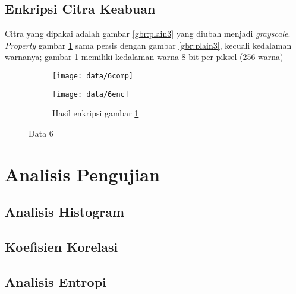 \subsection{Enkripsi Citra Keabuan}
Citra yang dipakai adalah gambar \ref{gbr:plain3} yang diubah menjadi \textit{grayscale}.
 \textit{Property} gambar \ref{gbr:plain6} sama persis dengan gambar \ref{gbr:plain3}, kecuali
 kedalaman warnanya; gambar \ref{gbr:plain6} memiliki kedalaman warna 8-bit per piksel (256 warna)
\begin{figure}\centering
	\begin{subfigure}{\textwidth}
		\texttt{[image: data/6comp]}
		\caption{}
		\label{gbr:plain6}
	\end{subfigure}
	\begin{subfigure}{\textwidth}
		\texttt{[image: data/6enc]}
		\caption{Hasil enkripsi gambar \ref{gbr:plain6}}
		\label{gbr:enc6}
	\end{subfigure}
	\caption{Data 6}
	\label{gbr:data6}
\end{figure}

\section{Analisis Pengujian}
\subsection{Analisis Histogram}
\subsection{Koefisien Korelasi}
\subsection{Analisis Entropi}



\newpage